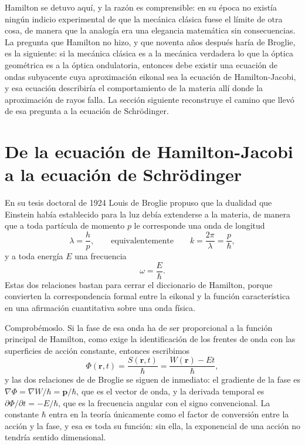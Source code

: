         Hamilton se detuvo aquí, y la razón es comprensible: en su época no existía ningún indicio experimental de que la mecánica clásica fuese el límite de otra cosa, de manera que la analogía era una elegancia matemática sin consecuencias. La pregunta que Hamilton no hizo, y que noventa años después haría de Broglie, es la siguiente: si la mecánica clásica es a la mecánica verdadera lo que la óptica geométrica es a la óptica ondulatoria, entonces debe existir una ecuación de ondas subyacente cuya aproximación eikonal sea la ecuación de Hamilton-Jacobi, y esa ecuación describiría el comportamiento de la materia allí donde la aproximación de rayos falla. La sección siguiente reconstruye el camino que llevó de esa pregunta a la ecuación de Schrödinger.

\section{De la ecuación de Hamilton-Jacobi a la ecuación de Schrödinger}

        En su tesis doctoral de 1924 Louis de Broglie propuso que la dualidad que Einstein había establecido para la luz debía extenderse a la materia, de manera que a toda partícula de momento $p$ le corresponde una onda de longitud
        \begin{equation}\label{eq:deBroglie}
            \lambda = \frac{h}{p},
            \qquad\text{equivalentemente}\qquad
            k = \frac{2\pi}{\lambda} = \frac{p}{\hbar},
        \end{equation}
        y a toda energía $E$ una frecuencia
        \begin{equation}\label{eq:PlanckEinstein}
            \omega = \frac{E}{\hbar} .
        \end{equation}
        Estas dos relaciones bastan para cerrar el diccionario de Hamilton, porque convierten la correspondencia formal entre la eikonal y la función característica en una afirmación cuantitativa sobre una onda física.

        Comprobémoslo. Si la fase de esa onda ha de ser proporcional a la función principal de Hamilton, como exige la identificación de los frentes de onda con las superficies de acción constante, entonces escribimos
        \begin{equation}\label{eq:FaseEsAccion}
            \Phi(\mathbf{r},t) = \frac{S(\mathbf{r},t)}{\hbar} = \frac{W(\mathbf{r}) - Et}{\hbar},
        \end{equation}
        y las dos relaciones de de Broglie se siguen de inmediato: el gradiente de la fase es $\nabla\Phi = \nabla W/\hbar = \mathbf{p}/\hbar$, que es el vector de onda, y la derivada temporal es $\partial\Phi/\partial t = -E/\hbar$, que es la frecuencia angular con el signo convencional. La constante $\hbar$ entra en la teoría únicamente como el factor de conversión entre la acción y la fase, y esa es toda su función: sin ella, la exponencial de una acción no tendría sentido dimensional.

